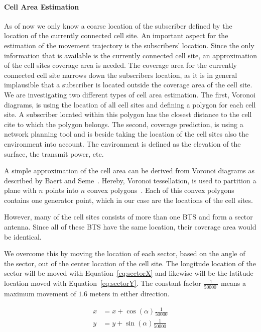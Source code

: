 \documentclass[twocolumn]{bmcart}%
\begin{document}
\paragraph*{Cell Area Estimation}
As of now we only know a coarse location of the subscriber defined by the location of the currently connected cell site. An important aspect for the estimation of the movement trajectory is the subscribers' location. Since the only information that is available is the currently connected cell site, an approximation of the cell sites coverage area is needed. The coverage area for the currently connected cell site narrows down the subscribers location, as it is in general implausible that a subscriber is located outside the coverage area of the cell site. We are investigating two different types of cell area estimation. The first, Voronoi diagrams, is using the location of all cell sites and defining a polygon for each cell site. A subscriber located within this polygon has the closest distance to the cell cite to which the polygon belongs. The second, coverage prediction, is using a network planning tool and is beside taking the location of the cell sites also  the environment into account. The environment is defined as the elevation of the surface, the transmit power, etc. \newline


A simple approximation of the cell area can be derived from Voronoi diagrams as described by Baert and Seme~\cite{Baert2004}. Hereby, Voronoi tessellation, is used to partition a plane with $n$ points into $n$ convex polygons~\cite{Aurenhammer1991}. Each of this convex polygons contains one generator point, which in our case are the locations of the cell sites. 

However, many of the cell sites consists of more than one BTS and form a sector antenna. Since all of these BTS have the same location, their coverage area would be identical. 

We overcome this by moving the location of each sector, based on the angle of the sector, out of the center location of the cell site. The longitude location of the sector will be moved with Equation~\ref{eq:sectorX} and likewise will be the latitude location moved with Equation~\ref{eq:sectorY}. The constant factor $\frac{1}{50000^\circ}$ means a maximum movement of $1.6$ meters in either direction.

\begin{align}
	x & =x+\cos(\alpha)\frac{1}{50000}\label{eq:sectorX}  \\
	y & =y+\sin(\alpha)\frac{1}{50000} \label{eq:sectorY} 
\end{align}
\newline
\end{document}
